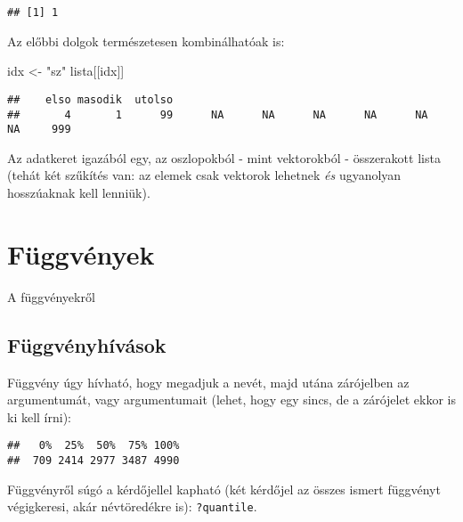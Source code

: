 \documentclass[]{book}
\newenvironment{Shaded}{\begin{snugshade}}{\end{snugshade}}
\newcommand{\KeywordTok}[1]{\textcolor[rgb]{0.13,0.29,0.53}{\textbf{#1}}}
\newcommand{\NormalTok}[1]{#1}
\newcommand{\OperatorTok}[1]{\textcolor[rgb]{0.81,0.36,0.00}{\textbf{#1}}}
\newcommand{\StringTok}[1]{\textcolor[rgb]{0.31,0.60,0.02}{#1}}
\begin{document}
\begin{verbatim}
## [1] 1
\end{verbatim}

Az előbbi dolgok természetesen kombinálhatóak is:

\begin{Shaded}
\begin{Highlighting}[]
\NormalTok{idx <-}\StringTok{ "sz"}
\NormalTok{lista[[idx]]}
\end{Highlighting}
\end{Shaded}

\begin{verbatim}
##    elso masodik  utolso                                                         
##       4       1      99      NA      NA      NA      NA      NA      NA     999
\end{verbatim}

Az adatkeret igazából egy, az oszlopokból - mint vektorokból - összerakott lista (tehát két szűkítés van: az elemek csak vektorok lehetnek \emph{és} ugyanolyan hosszúaknak kell lenniük).

\hypertarget{fuxfcggvuxe9nyek}{%
\chapter{Függvények}\label{fuxfcggvuxe9nyek}}

A függvényekről

\hypertarget{fuxfcggvuxe9nyhuxedvuxe1sok}{%
\section{Függvényhívások}\label{fuxfcggvuxe9nyhuxedvuxe1sok}}

Függvény úgy hívható, hogy megadjuk a nevét, majd utána zárójelben az argumentumát, vagy argumentumait (lehet, hogy egy sincs, de a zárójelet ekkor is ki kell írni):

\begin{Shaded}
\end{Shaded}

\begin{verbatim}
##   0%  25%  50%  75% 100% 
##  709 2414 2977 3487 4990
\end{verbatim}

Függvényről súgó a kérdőjellel kapható (két kérdőjel az összes ismert függvényt végigkeresi, akár névtöredékre is): \texttt{?quantile}.
\end{document}

